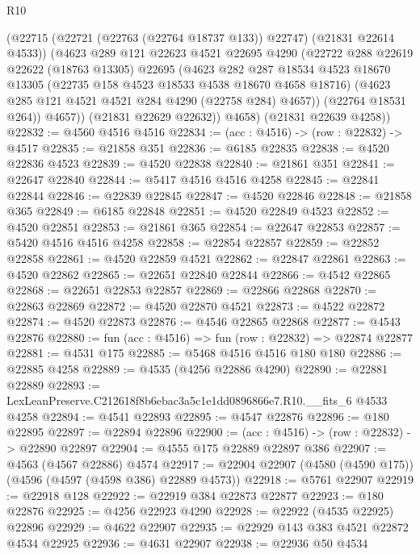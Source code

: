 \begin{lexlean}{R10}
\begin{coremodule}
            (@22715 (@22721 (@22763 (@22764 @18737 @133)) @22747) (@21831 @22614 @4533))
            (@4623
              @289
              @121
              @22623
              @4521
              @22695
              @4290
              (@22722
                @288
                @22619
                @22622
                (@18763 @13305)
                @22695
                (@4623
                  @282
                  @287
                  @18534
                  @4523
                  @18670
                  @13305
                  (@22735 @158 @4523 @18533 @4538 @18670 @4658 @18716)
                  (@4623 @285 @121 @4521 @4521 @284 @4290 (@22758 @284) @4657))
                (@22764 @18531 @264))
              @4657))
          (@21831 @22629 @22632))
        @4658)
      (@21831 @22639 @4258))
@22832 := @4560 @4516 @4516
@22834 := (acc : @4516) -> (row : @22832) -> @4517
@22835 := @21858 @351
@22836 := @6185 @22835
@22838 := @4520 @22836 @4523
@22839 := @4520 @22838
@22840 := @21861 @351
@22841 := @22647 @22840
@22844 := @5417 @4516 @4516 @4258
@22845 := @22841 @22844
@22846 := @22839 @22845
@22847 := @4520 @22846
@22848 := @21858 @365
@22849 := @6185 @22848
@22851 := @4520 @22849 @4523
@22852 := @4520 @22851
@22853 := @21861 @365
@22854 := @22647 @22853
@22857 := @5420 @4516 @4516 @4258
@22858 := @22854 @22857
@22859 := @22852 @22858
@22861 := @4520 @22859 @4521
@22862 := @22847 @22861
@22863 := @4520 @22862
@22865 := @22651 @22840 @22844
@22866 := @4542 @22865
@22868 := @22651 @22853 @22857
@22869 := @22866 @22868
@22870 := @22863 @22869
@22872 := @4520 @22870 @4521
@22873 := @4522 @22872
@22874 := @4520 @22873
@22876 := @4546 @22865 @22868
@22877 := @4543 @22876
@22880 := fun (acc : @4516) => fun (row : @22832) => @22874 @22877
@22881 := @4531 @175
@22885 := @5468 @4516 @4516 @180 @180
@22886 := @22885 @4258
@22889 := @4535 (@4256 @22886 @4290)
@22890 := @22881 @22889
@22893 := LexLeanPreserve.C212618f8b6ebac3a5c1e1dd0896866e7.R10.__fits_6 @4533 @4258
@22894 := @4541 @22893
@22895 := @4547 @22876
@22896 := @180 @22895
@22897 := @22894 @22896
@22900 := (acc : @4516) -> (row : @22832) -> @22890 @22897
@22904 := @4555 @175 @22889 @22897 @386
@22907 := @4563 (@4567 @22886) @4574
@22917 := @22904 @22907 (@4580 (@4590 @175)) (@4596 (@4597 (@4598 @386) @22889 @4573))
@22918 := @5761 @22907
@22919 := @22918 @128
@22922 := @22919 @384 @22873 @22877
@22923 := @180 @22876
@22925 := @4256 @22923 @4290
@22928 := @22922 (@4535 @22925) @22896
@22929 := @4622 @22907
@22935 := @22929 @143 @383 @4521 @22872 @4534 @22925
@22936 := @4631 @22907
@22938 := @22936 @50 @4534

\end{coremodule}
\end{lexlean}
